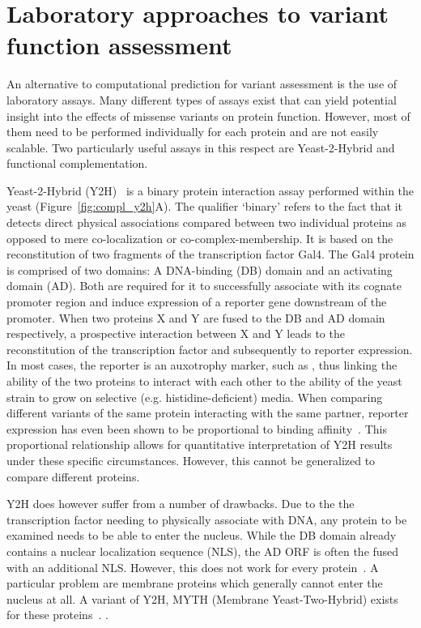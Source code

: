 \section{Laboratory approaches to variant function assessment}
\label{complY2HIntro}

An alternative to computational prediction for variant assessment is the use of laboratory assays. Many different types of assays exist that can yield potential insight into the effects of missense variants on protein function. However, most of them need to be performed individually for each protein and are not easily scalable. Two particularly useful assays in this respect are Yeast-2-Hybrid and functional complementation.

Yeast-2-Hybrid (Y2H)~\cite{fields_novel_1989} is a binary protein interaction assay performed within the yeast  (Figure~\ref{fig:compl_y2h}A). The qualifier `binary' refers to the fact that it detects direct physical associations compared between two individual proteins as opposed to mere co-localization or co-complex-membership. It is based on the reconstitution of two fragments of the transcription factor Gal4. The Gal4 protein is comprised of two domains: A DNA-binding (DB) domain and an activating domain (AD). Both are required for it to successfully associate with its cognate promoter region and induce expression of a reporter gene downstream of the promoter. When two proteins X and Y are fused to the DB and AD domain respectively, a prospective interaction between X and Y leads to the reconstitution of the transcription factor and subsequently to reporter expression. In most cases, the reporter is an auxotrophy marker, such as , thus linking the ability of the two proteins to interact with each other to the ability of the yeast strain to grow on selective (e.g. histidine-deficient) media. When comparing different variants of the same protein interacting with the same partner, reporter expression has even been shown to be proportional to binding affinity~\cite{yang_protein-peptide_1995}. This proportional relationship allows for quantitative interpretation of Y2H results under these specific circumstances. However, this cannot be generalized to compare different proteins.

Y2H does however suffer from a number of drawbacks. Due to the the transcription factor needing to physically associate with DNA, any protein to be examined needs to be able to enter the nucleus. While the DB domain already contains a nuclear localization sequence (NLS), the AD ORF is often the fused with an additional NLS. However, this does not work for every protein~\cite{van_criekinge_yeast_1999}. A particular problem are membrane proteins which generally cannot enter the nucleus at all. A variant of Y2H, MYTH (Membrane Yeast-Two-Hybrid) exists for these proteins~\cite{snider_split-ubiquitin_2010}. .


